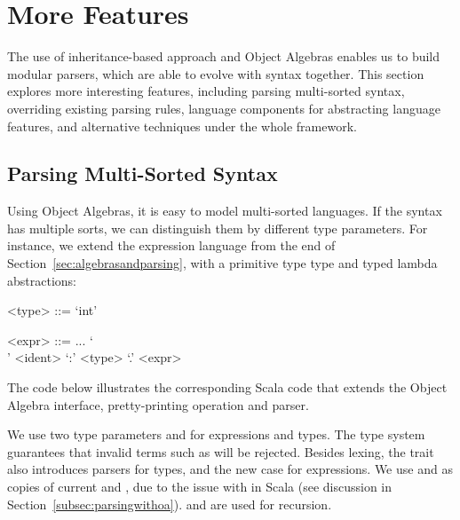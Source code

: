 \section{More Features}

The use of inheritance-based approach and Object Algebras enables us
to build modular parsers, which are able to evolve with
syntax together. This section explores more interesting features, including
parsing multi-sorted syntax, overriding existing parsing rules,
language components for abstracting language features, and alternative
techniques under the whole framework.

\subsection{Parsing Multi-Sorted Syntax}\label{subsec:differentsyntax}

\begin{comment}
As illustrated above, using Object Algebras separates data structures from behaviors, thus enabling more modularity and reuse. New language constructs correspond to the new cases in the algebra. Different operations
 on structures, with both code reuse and separate compilation supported.
\end{comment}

Using Object Algebras, it is easy to
model multi-sorted languages. If the syntax has multiple sorts, we can distinguish them by different type parameters.
For instance, we extend the expression language from the end of Section~\ref{sec:algebrasandparsing}, with a
primitive type  type and typed lambda abstractions:

\vspace{0.8mm}

\setlength{\grammarindent}{5em}
\begin{grammar}
<type> ::= `int'

<expr> ::=  ... \alt `\\' <ident> `:' <type> `.' <expr>
\end{grammar}

\vspace{0.8mm}

The code below illustrates the corresponding Scala code
that extends the Object Algebra interface, pretty-printing operation and parser.


We use two type parameters  and  for expressions and types. The type system guarantees that invalid terms such as  will be rejected.
Besides lexing, the trait  also introduces parsers for types, and the new case for expressions.
We use  and  as copies of current  and , due to the issue
with  in Scala (see discussion in Section~\ref{subsec:parsingwithoa}).  and  are used for recursion.


